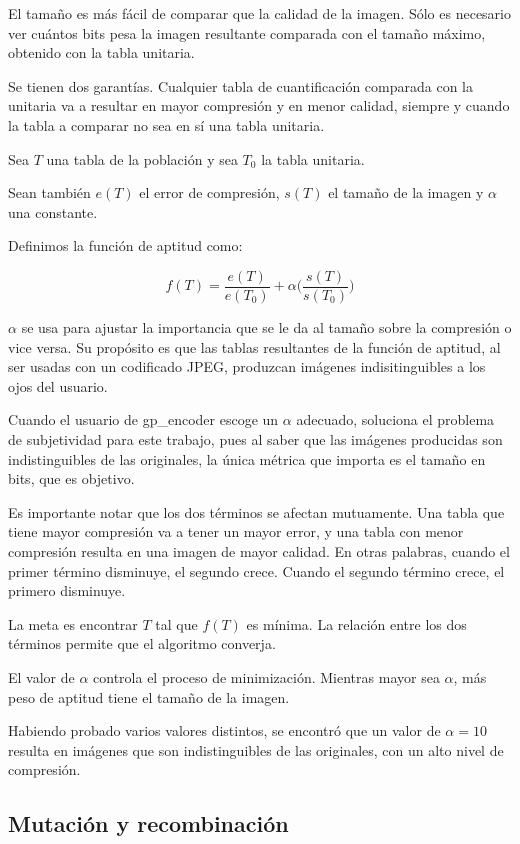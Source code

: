 El tamaño es más fácil de comparar que la calidad de la imagen. Sólo es
necesario ver cuántos bits pesa la imagen resultante comparada con el tamaño
máximo, obtenido con la tabla unitaria.

Se tienen dos garantías. Cualquier tabla de cuantificación comparada con la
unitaria va a resultar en mayor compresión y en menor calidad, siempre y cuando
la tabla a comparar no sea en sí una tabla unitaria.

Sea $T$ una tabla de la población y sea $T_0$ la tabla unitaria.

Sean también $e(T)$ el error de compresión, $s(T)$ el tamaño de la
imagen y $\alpha$ una constante.

Definimos la función de aptitud como:

\begin{equation}
f(T) = \frac{e(T)}{e(T_0)} + \alpha \Big(\frac{s(T)}{s(T_0)}\Big)
\end{equation}\label{eq:fitness}

$\alpha$ se usa para ajustar la importancia que se le da al tamaño sobre la
compresión o vice versa. Su propósito es que las tablas resultantes de la
función de aptitud, al ser usadas con un codificado JPEG, produzcan imágenes
indisitinguibles a los ojos del usuario.

Cuando el usuario de gp\_encoder escoge un $\alpha$ adecuado, soluciona el
problema de subjetividad para este trabajo, pues al saber que las imágenes
producidas son indistinguibles de las originales, la única métrica que importa
es el tamaño en bits, que es objetivo.

Es importante notar que los dos términos se afectan mutuamente. Una tabla que tiene mayor
compresión va a tener un mayor error, y una tabla con menor compresión resulta
en una imagen de mayor calidad. En otras palabras, cuando el primer término
disminuye, el segundo crece. Cuando el segundo término crece, el primero
disminuye.

La meta es encontrar $T$ tal que $f(T)$ es mínima. La relación entre los
dos términos permite que el algoritmo converja.

El valor de $\alpha$ controla el proceso de minimización. Mientras mayor sea
$\alpha$, más peso de aptitud tiene el tamaño de la imagen.

Habiendo probado varios valores distintos, se encontró que un valor de $\alpha
= 10$ resulta en imágenes que son indistinguibles de las originales, con un alto
nivel de compresión.

\subsection {Mutación y recombinación}

